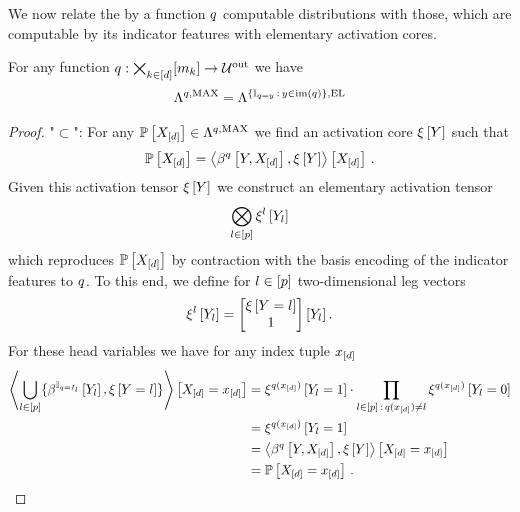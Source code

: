 We now relate the by a function $q$ computable distributions with those, which are computable by its indicator features with elementary activation cores.

\begin{lemma}
    \label{lem:computableByFunctionEqualElementaryIndicators}
    For any function $q:\bigtimes_{k\in[d]}[m_{k}]\rightarrow\mathcal{U}^{\mathrm{out}}$ we have
    \begin{align*}
        \Lambda^{q,\mathrm{MAX}}
        = \Lambda^{\{\mathbb{I}_{q=y}\,:\,y\in\mathrm{im}\left(q\right)\},\mathrm{EL}}
    \end{align*}
\end{lemma}
\begin{proof}
    "$\subset$":
    For any $\mathbb{P}\left[X_{[d]}\right]\in\Lambda^{q,\mathrm{MAX}}$ we find an activation core $\xi\left[Y\right]$ such that
    \begin{align*}
        \mathbb{P}\left[X_{[d]}\right] = \left\langle \beta^{q}\left[Y,X_{[d]}\right],\xi\left[Y\right]\right\rangle \left[ X_{[d]} \right] \, .
    \end{align*}
    Given this activation tensor $\xi\left[Y\right]$ we construct an elementary activation tensor
    \begin{align*}
        \bigotimes_{l\in[p]}\xi^{l}\left[Y_{l}\right]
    \end{align*}
    which reproduces $\mathbb{P}\left[X_{[d]}\right]$ by contraction with the basis encoding of the indicator features to $q$. %
    To this end, we define for $l\in[p]$ two-dimensional leg vectors
    \begin{align*}
        \xi^{l}\left[Y_{l}\right]
        = \begin{bmatrix}
              \xi\left[Y=l\right] \\
              1
        \end{bmatrix}[Y_{l}] \, .
    \end{align*}
    For these head variables we have for any index tuple $x_{[d]}$
    \begin{align*}
        \left\langle \bigcup_{l\in[p]}\{\beta^{\mathbb{I}_{q=I_{l}}}\left[Y_{l}\right],\xi\left[Y=l\right]\}\right\rangle \left[ X_{[d]}=x_{[d]} \right]
        & = \xi^{q(x_{[d]})}\left[Y_{l}=1\right] \cdot \prod_{l\in[p] \,:\, q(x_{[d]}) \neq l} \xi^{q(x_{[d]})}\left[Y_{l}=0\right] \\
        & = \xi^{q(x_{[d]})}\left[Y_{l}=1\right] \\
        & = \left\langle \beta^{q}\left[Y,X_{[d]}\right],\xi\left[Y\right]\right\rangle \left[ X_{[d]}=x_{[d]} \right] \\
        & = \mathbb{P}\left[X_{[d]}=x_{[d]}\right] \, .
    \end{align*}


\end{proof}

